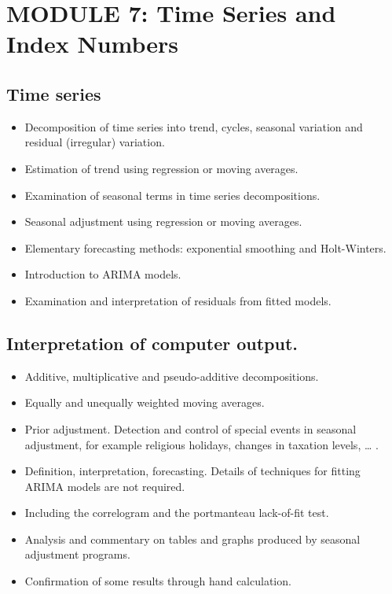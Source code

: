 
\section*{MODULE 7: Time Series and Index Numbers}
\subsection*{Time series}
\begin{itemize}
\item	Decomposition of time series into trend, cycles, seasonal variation and residual (irregular) variation.
\item	Estimation of trend using regression or moving averages.
\item	Examination of seasonal terms in time series decompositions. 
\item	Seasonal adjustment using regression or moving averages.
\item	Elementary forecasting methods: exponential smoothing and Holt-Winters.
\item	Introduction to ARIMA models.
\item	Examination and interpretation of residuals from fitted models.
\end{itemize}
\subsection*{Interpretation of computer output.}
\begin{itemize}
\item	Additive, multiplicative and pseudo-additive decompositions.
\item	Equally and unequally weighted moving averages.
\item	Prior adjustment. Detection and control of special events in seasonal adjustment, for example religious holidays, changes in taxation levels, … .
\item	Definition, interpretation, forecasting. Details of techniques for fitting ARIMA models are not required.
\item	Including the correlogram and the portmanteau lack-of-fit test.
\item	Analysis and commentary on tables and graphs produced by seasonal adjustment programs.
\item	Confirmation of some results through hand calculation.
\end{itemize}
